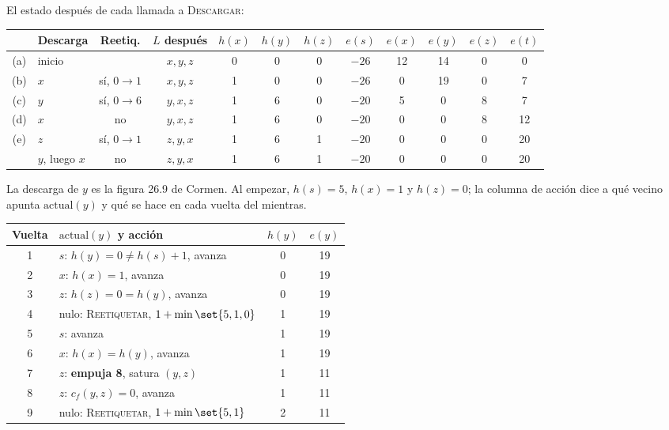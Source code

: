 \documentclass[11pt,letterpaper]{article}
\begin{document}
\begin{ejemplo}
  El estado después de cada llamada a \textsc{Descargar}:
  \begin{center}
  \small
  \setlength{\tabcolsep}{4.5pt}
  \begin{tabular}{clcccccccccc}
    \toprule
    & \textbf{Descarga} & \textbf{Reetiq.} & $L$ después
      & $h(x)$ & $h(y)$ & $h(z)$ & $e(s)$ & $e(x)$ & $e(y)$ & $e(z)$
      & $e(t)$ \\
    \midrule
    (a) & inicio & & $x, y, z$ & 0 & 0 & 0 & $-26$ & 12 & 14 & 0 & 0 \\
    (b) & $x$ & sí, $0 \to 1$ & $x, y, z$ & 1 & 0 & 0 & $-26$ & 0 & 19
        & 0 & 7 \\
    (c) & $y$ & sí, $0 \to 6$ & $y, x, z$ & 1 & 6 & 0 & $-20$ & 5 & 0
        & 8 & 7 \\
    (d) & $x$ & no & $y, x, z$ & 1 & 6 & 0 & $-20$ & 0 & 0 & 8 & 12 \\
    (e) & $z$ & sí, $0 \to 1$ & $z, y, x$ & 1 & 6 & 1 & $-20$ & 0 & 0
        & 0 & 20 \\
    & $y$, luego $x$ & no & $z, y, x$ & 1 & 6 & 1 & $-20$ & 0 & 0 & 0
        & 20 \\
    \bottomrule
  \end{tabular}
  \end{center}
  La descarga de $y$ es la figura 26.9 de Cormen. Al empezar,
  $h(s) = 5$, $h(x) = 1$ y $h(z) = 0$; la columna de acción dice a qué
  vecino apunta $\text{actual}(y)$ y qué se hace en cada vuelta del
  mientras.
  \begin{center}
  \small
  \begin{tabular}{clcc}
    \toprule
    \textbf{Vuelta} & \textbf{$\text{actual}(y)$ y acción}
      & $h(y)$ & $e(y)$ \\
    \midrule
    1 & $s$: $h(y) = 0 \neq h(s) + 1$, avanza & 0 & 19 \\
    2 & $x$: $h(x) = 1$, avanza & 0 & 19 \\
    3 & $z$: $h(z) = 0 = h(y)$, avanza & 0 & 19 \\
    4 & nulo: \textsc{Reetiquetar}, $1 + \min\set{5, 1, 0}$ & 1 & 19 \\
    5 & $s$: avanza & 1 & 19 \\
    6 & $x$: $h(x) = h(y)$, avanza & 1 & 19 \\
    7 & $z$: \textbf{empuja 8}, satura $(y, z)$ & 1 & 11 \\
    8 & $z$: $c_f(y, z) = 0$, avanza & 1 & 11 \\
    9 & nulo: \textsc{Reetiquetar}, $1 + \min\set{5, 1}$ & 2 & 11 \\

\end{tabular}
\end{center}
\end{ejemplo}
\end{document}
